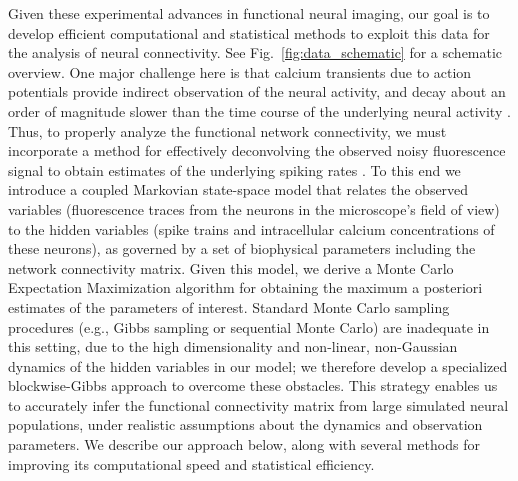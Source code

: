 Given these experimental advances in functional neural imaging, our goal is to develop efficient computational and statistical methods to exploit this data for the analysis of neural connectivity. See Fig.~\ref{fig:data_schematic} for a schematic overview. One major challenge here is that calcium transients due to action potentials provide indirect observation of the neural activity, and decay about an order of magnitude slower than the time course of the underlying neural activity \cite{ImagingManual}. Thus, to properly analyze the functional network connectivity, we must incorporate a method for effectively deconvolving the observed noisy fluorescence signal to obtain estimates of the underlying spiking rates \cite{YaksiFriedrich06,GreenbergKerr08,Vogelstein2009}. To this end we introduce a coupled Markovian state-space model that relates the observed variables (fluorescence traces from the neurons in the microscope's field of view) to the hidden variables (spike trains and intracellular calcium concentrations of these neurons), as governed by a set of biophysical parameters including the network connectivity matrix. Given this model, we derive a Monte Carlo Expectation Maximization algorithm for obtaining the maximum a posteriori estimates of the parameters of interest. Standard Monte Carlo sampling procedures (e.g., Gibbs sampling or sequential Monte Carlo) are inadequate in this setting, due to the high dimensionality and non-linear, non-Gaussian dynamics of the hidden variables in our model; we therefore develop a specialized blockwise-Gibbs approach to overcome these obstacles. This strategy enables us to accurately infer the functional connectivity matrix from large simulated neural populations, under realistic assumptions about the dynamics and observation parameters. We describe our approach below, along with several methods for improving its computational speed and statistical efficiency. 